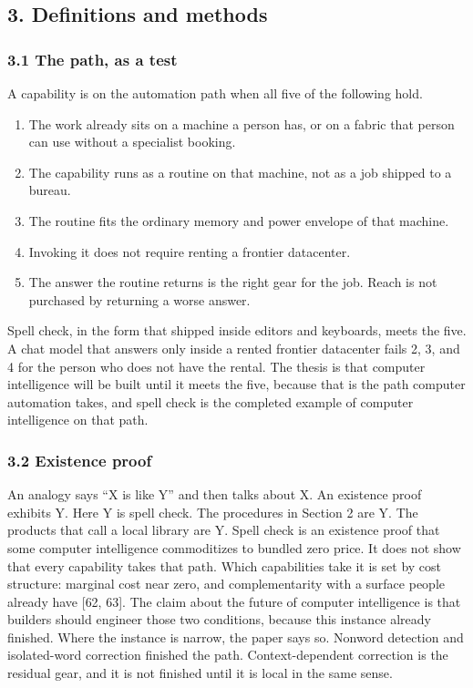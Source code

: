 \documentclass[
  10pt,
]{article}
\providecommand{\tightlist}{%
  \setlength{\itemsep}{0pt}\setlength{\parskip}{0pt}}
\begin{document}
\subsection{3. Definitions and methods}\label{definitions-and-methods}

\subsubsection{3.1 The path, as a test}\label{the-path-as-a-test}

A capability is on the automation path when all five of the following
hold.

\begin{enumerate}
\def\labelenumi{\arabic{enumi}.}
\tightlist
\item
  The work already sits on a machine a person has, or on a fabric that
  person can use without a specialist booking.
\item
  The capability runs as a routine on that machine, not as a job shipped
  to a bureau.
\item
  The routine fits the ordinary memory and power envelope of that
  machine.
\item
  Invoking it does not require renting a frontier datacenter.
\item
  The answer the routine returns is the right gear for the job. Reach is
  not purchased by returning a worse answer.
\end{enumerate}

Spell check, in the form that shipped inside editors and keyboards,
meets the five. A chat model that answers only inside a rented frontier
datacenter fails 2, 3, and 4 for the person who does not have the
rental. The thesis is that computer intelligence will be built until it
meets the five, because that is the path computer automation takes, and
spell check is the completed example of computer intelligence on that
path.

\subsubsection{3.2 Existence proof}\label{existence-proof}

An analogy says ``X is like Y'' and then talks about X. An existence
proof exhibits Y. Here Y is spell check. The procedures in Section 2 are
Y. The products that call a local library are Y. Spell check is an
existence proof that some computer intelligence commoditizes to bundled
zero price. It does not show that every capability takes that path.
Which capabilities take it is set by cost structure: marginal cost near
zero, and complementarity with a surface people already have {[}62,
63{]}. The claim about the future of computer intelligence is that
builders should engineer those two conditions, because this instance
already finished. Where the instance is narrow, the paper says so.
Nonword detection and isolated-word correction finished the path.
Context-dependent correction is the residual gear, and it is not
finished until it is local in the same sense.
\end{document}
